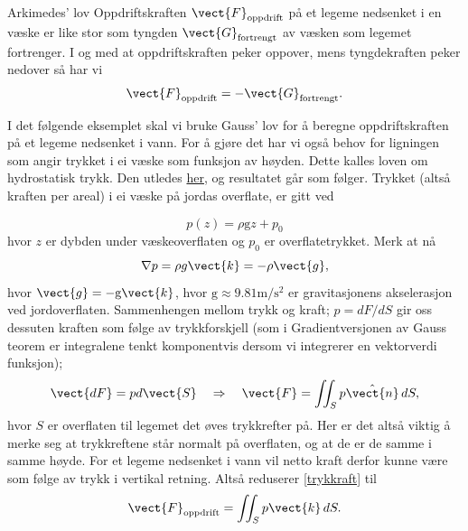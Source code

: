 \begin{oppsum}{Arkimedes' lov}
Oppdriftskraften $\vect{F}_\textrm{oppdrift}$ på et legeme nedsenket i en væske er like stor som tyngden $\vect{G}_\textrm{fortrengt}$ av væsken som legemet fortrenger. I og med at oppdriftskraften peker oppover, mens tyngdekraften peker nedover så har vi 
\begin{equation}
    \label{arkimedes}
    \vect{F}_\textrm{oppdrift}=-\vect{G}_\textrm{fortrengt}.
\end{equation}
\end{oppsum}
I det følgende eksemplet skal vi bruke Gauss' lov for å beregne oppdriftskraften på et legeme nedsenket i vann. For å gjøre det har vi også behov for ligningen som angir trykket i ei væske som funksjon av høyden. Dette kalles loven om hydrostatisk trykk. Den utledes \href{https://www.youtube.com/watch?v=RpJu9hDTsGU&list=PLBSPq-MdQqruVxoeYU6tAZ9t-kDUXXhoE&index=5}{her}, og resultatet går som følger. Trykket (altså kraften per areal) i ei væske på jordas overflate, er gitt ved

\begin{equation}
    p(z)=\rho\textrm{g}z+p_0
\end{equation}
hvor $z$ er dybden under væskeoverflaten og $p_0$ er overflatetrykket. Merk at nå  
\begin{equation}
\label{gradp}
    \nabla p = \rho g\vect{k} = -\rho\vect{g},
\end{equation}
hvor $\vect{g}=-\textrm{g}\vect{k}$, hvor $\textrm{g}\approx 9.81\textrm{m}/\textrm{s}^2$ er gravitasjonens akselerasjon ved jordoverflaten. Sammenhengen mellom trykk og kraft; $p=dF/dS$ gir oss dessuten kraften som følge av trykkforskjell (som i Gradientversjonen av Gauss teorem er integralene tenkt komponentvis dersom vi integrerer en vektorverdi funksjon);
\begin{align}
\label{trykkraft}
   \vect{dF}= p d\vect{S} \quad\Rightarrow \quad \vect{F}=\iint_S p\hat{\vect{n}} \,dS,
\end{align}
hvor $S$ er overflaten til legemet det øves trykkrefter på. Her er det altså viktig å merke seg at trykkreftene står normalt på overflaten, og at de er de samme i samme høyde. For et legeme nedsenket i vann vil netto kraft derfor kunne være som følge av trykk i vertikal retning. Altså reduserer \eqref{trykkraft} til
\begin{align}
\label{trykkraft2}
\vect{F}_\textrm{oppdrift}=\iint_S p\vect{k}\, dS.
\end{align}

